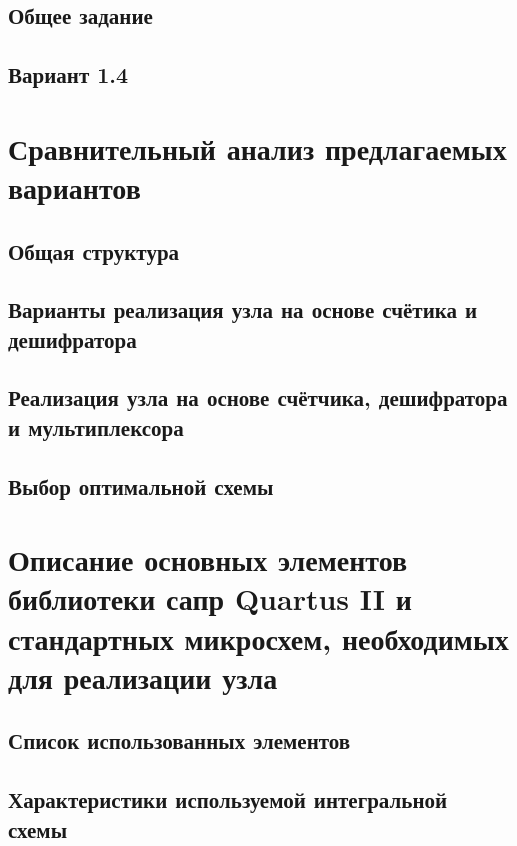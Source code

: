 \documentclass[a4paper,14pt,russian]{article}
\begin{document}
\subsection{Общее задание}


\subsection{Вариант 1.4}


\section{Сравнительный анализ предлагаемых вариантов}

\subsection{Общая структура}

\subsection{Варианты реализация узла на основе счётика и дешифратора}


\subsection{Реализация узла на основе счётчика, дешифратора и мультиплексора}
\label{sections:secondnode}


\subsection{Выбор оптимальной схемы}


\section{Описание основных элементов библиотеки сапр Quartus II и стандартных микросхем, необходимых для реализации узла}

\subsection{Список использованных элементов}


\subsection{Характеристики используемой интегральной схемы}

\end{document}
